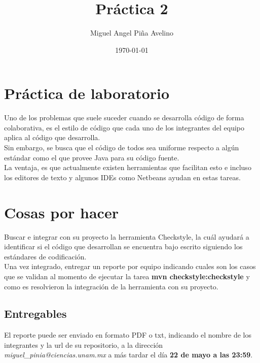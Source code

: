 \documentclass[11pt]{article}
\author{Miguel Angel Piña Avelino}
\date{\today}
\title{Práctica 2}
\begin{document}
\maketitle

\section*{Práctica de laboratorio}

Uno de los problemas que suele suceder cuando se desarrolla código de
forma colaborativa, es el estilo de código que cada uno de los
integrantes del equipo aplica al código que desarrolla.\\
\newline
Sin embargo, se busca que el código de todos sea uniforme respecto a
algún estándar como el que provee Java para su código fuente.\\
\newline
La ventaja, es que actualmente existen herramientas que facilitan
esto e incluso los editores de texto y algunos IDEs como Netbeans
ayudan en estas tareas.

\section*{Cosas por hacer}

Buscar e integrar con su proyecto la herramienta Checkstyle, la cuál
ayudará a identificar si el código que desarrollan se encuentra bajo
escrito siguiendo los estándares de codificación.\\
\newline
Una vez integrado, entregar un reporte por equipo indicando cuales son
los casos que se validan al momento de ejecutar la tarea \textbf{mvn
checkstyle:checkstyle} y como es resolvieron la integración de la
herramienta con su proyecto.


\subsection*{Entregables}

El reporte puede ser enviado en formato PDF o txt, indicando el nombre
de los integrantes y la url de su repositorio, a la dirección
\textit{miguel\_pinia@ciencias.unam.mx} a más tardar el día \textbf{22 de mayo
a las 23:59}.
\end{document}
